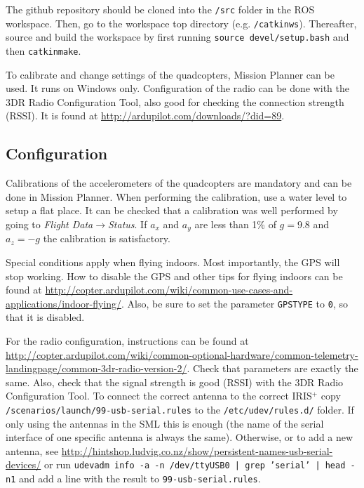 \documentclass[titlepage,11pt,a4paper]{article}
\begin{document}
The github repository should be cloned into the \texttt{/src} folder
in the ROS workspace. Then, go to the workspace top directory (e.g.
\texttt{/catkin\textunderscore ws}). Thereafter, source and build the
workspace by first running \texttt{source devel/setup.bash} and then
\texttt{catkin\textunderscore make}.

To calibrate and change settings of the quadcopters, Mission Planner
can be used. It runs on Windows only. Configuration of the radio can
be done with the 3DR Radio Configuration Tool, also good for checking
the connection strength (RSSI). It is found at
\url{http://ardupilot.com/downloads/?did=89}.


\subsection{Configuration}
\label{subsec:configuration}
Calibrations of the accelerometers of the quadcopters are mandatory
and can be done in Mission Planner. When performing the calibration,
use a water level to setup a flat place. It can be checked that a
calibration was well performed by going to \textit{Flight
 Data}$\rightarrow$\textit{Status}. If $a_x$ and $a_y$ are less than
1\% of $g = 9.8$ and $a_z = -g$ the calibration is satisfactory.

Special conditions apply when flying indoors. Most importantly, the
GPS will stop working. How to disable the GPS and other tips for
flying indoors can be found at \url{http://copter.ardupilot.com/wiki/common-use-cases-and-applications/indoor-flying/}. Also, be sure to set the parameter \texttt{GPS\textunderscore TYPE} to \texttt{0}, so that it is disabled. 

For the radio configuration, instructions can be found at
\url{http://copter.ardupilot.com/wiki/common-optional-hardware/common-telemetry-landingpage/common-3dr-radio-version-2/}. Check
that parameters are exactly the same. Also, check that the signal
strength is good (RSSI) with the 3DR Radio Configuration Tool. To
connect the correct antenna to the correct IRIS$^+$ copy
\texttt{/scenarios/launch/99-usb-serial.rules} to the
\texttt{/etc/udev/rules.d/} folder. If only using the antennas in the
SML this is enough (the name of the serial interface of one specific antenna is always
the same). Otherwise, or to add a new antenna, see
\url{http://hintshop.ludvig.co.nz/show/persistent-names-usb-serial-devices/}
or run \texttt{udevadm info -a -n /dev/ttyUSB0 | grep '{serial}' |
  head -n1} and add a line with the result to
\texttt{99-usb-serial.rules}.
\end{document}
